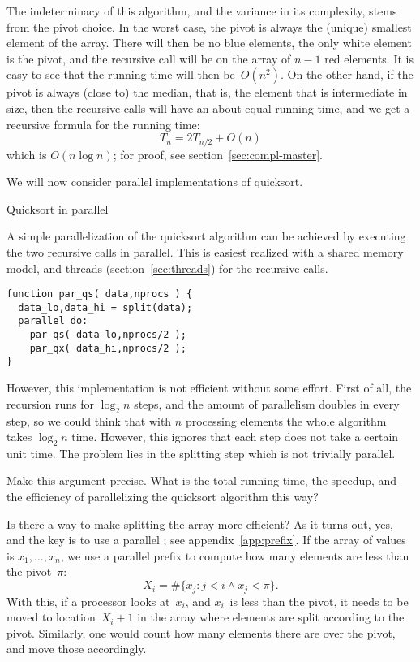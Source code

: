 The indeterminacy of this algorithm, and the variance in its
complexity, stems from the pivot choice. In the worst case, the pivot
is always the (unique) smallest element of the array. There will then
be no blue elements, the only white element is the pivot, and the
recursive call will be on the array of $n-1$ red elements. It is easy
to see that the running time will then be~$O(n^2)$. On the other hand,
if the pivot is always (close to) the median, that is, the element
that is intermediate in size, then the recursive calls will have an
about equal running time, and we get a recursive formula for the
running time:
\[ T_n = 2T_{n/2} + O(n) \]
which  is $O(n\log n)$;
for proof, see section~\ref{sec:compl-master}.

We will now consider parallel implementations of quicksort.

 {Quicksort in parallel}

A simple parallelization of the quicksort algorithm can be achieved by
executing the two recursive calls in parallel. This is easiest
realized with a shared memory model, and threads
(section~\ref{sec:threads}) for the recursive calls.

\begin{verbatim}
function par_qs( data,nprocs ) {
  data_lo,data_hi = split(data);
  parallel do:
    par_qs( data_lo,nprocs/2 );
    par_qx( data_hi,nprocs/2 );
}
\end{verbatim}

However, this implementation is not efficient without some effort.
First of all, the recursion runs for $\log_2 n$ steps,
and the amount of parallelism doubles in every step,
so we could think that with $n$ processing elements
the whole algorithm takes $\log_2 n$ time.
However, this ignores that each step does not take a certain unit time.
The problem lies in the splitting step which is not trivially parallel.

\begin{exercise}
  Make this argument precise. What is the total running time, the
  speedup, and the efficiency of parallelizing the quicksort algorithm
  this way?
\end{exercise}

Is there a way to make splitting the array more efficient?
As it turns out, yes, and the key is to use a parallel
; see appendix~\ref{app:prefix}.
If the array of values
is $x_1,\ldots,x_n$, we use a parallel prefix to compute
how many elements are less than the pivot~$\pi$:
\[ X_i=\#\{ x_j\colon j<i\wedge x_j<\pi \}. \]
With this, if a processor looks at~$x_i$, and $x_i$~is less
than the pivot, it needs to be moved to location~$X_i+1$
in the array where elements are split according to the pivot.
%
Similarly, one would count how many elements there are over the pivot,
and move those accordingly.

